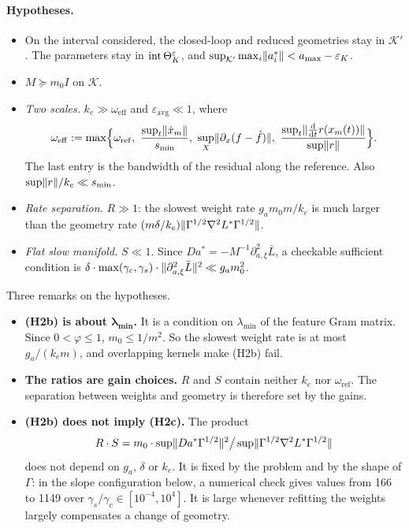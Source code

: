 \paragraph{Hypotheses.}
\begin{itemize}[leftmargin=4.2em,labelsep=0.6em]
  \item[(H0)] On the interval considered, the closed-loop and reduced geometries stay in $\mathcal{K}'$. The
    parameters stay in $\operatorname{int}\Theta_K^{\varepsilon}$, and $\sup_{\mathcal{K}'}\max_i\lVert a^*_i\rVert < a_{\max} -
    \varepsilon_K$.
  \item[(H1)] $M \succeq m_0 I$ on $\mathcal{K}$.
  \item[(H2a$'$)] \emph{Two scales.} $k_e \gg \omega_{\mathrm{eff}}$ and $\varepsilon_{\mathrm{avg}} \ll 1$, where
    \begin{equation*}
      \omega_{\mathrm{eff}} := \max\Bigl\{\omega_{\mathrm{ref}},\ \frac{\sup_t\norm{\dot x_m}}{s_{\min}},\
      \sup_X\norm{\partial_x(f - \fhat)},\ \frac{\sup_t\norm{\frac{\mathrm{d}}{\mathrm{d}t}r(x_m(t))}}{\sup\norm{r}}
      \Bigr\}.
    \end{equation*}
    The last entry is the bandwidth of the residual along the reference. Also $\sup\lVert r\rVert/k_e \ll s_{\min}$.
  \item[(H2b)] \emph{Rate separation.} $R \gg 1$: the slowest weight rate $g_a m_0 m/k_e$ is much larger than the
    geometry rate $(m\delta/k_e)\lVert \Gamma^{1/2}\nabla^2L^*\Gamma^{1/2}\rVert$.
  \item[(H2c)] \emph{Flat slow manifold.} $S \ll 1$. Since $Da^* = -M^{-1}\partial^2_{a,\xi}\bar L$, a checkable
    sufficient condition is $\delta\cdot\max(\gamma_c,\gamma_s)\cdot\lVert \partial^2_{a,\xi}\bar L\rVert^2 \ll g_a m_0^2$.
\end{itemize}

\medskip\noindent Three remarks on the hypotheses.
\begin{itemize}
  \item \textbf{(H2b) is about $\boldsymbol{\lambda_{\min}}$.} It is a condition on $\lambda_{\min}$ of the feature
    Gram matrix. Since $0 < \varphi \le 1$, $m_0 \le 1/m^2$. So the slowest weight rate is at most $g_a/(k_e m)$, and
    overlapping kernels make (H2b) fail.
  \item \textbf{The ratios are gain choices.} $R$ and $S$ contain neither $k_e$ nor $\omega_{\mathrm{ref}}$. The
    separation between weights and geometry is therefore set by the gains.
  \item \textbf{(H2b) does not imply (H2c).} The product
    \begin{equation*}
      R\cdot S = m_0\cdot\sup\lVert Da^*\Gamma^{1/2}\rVert^2\big/\sup\lVert \Gamma^{1/2}\nabla^2L^*\Gamma^{1/2}\rVert
    \end{equation*}
    does not depend on $g_a$, $\delta$ or $k_e$. It is fixed by the problem and by the shape of $\Gamma$: in the slope configuration
    below, a numerical check gives values from 166 to 1149 over $\gamma_s/\gamma_c\in[10^{-4},10^{4}]$. It is large
    whenever refitting the weights largely compensates a change of geometry.
\end{itemize}

